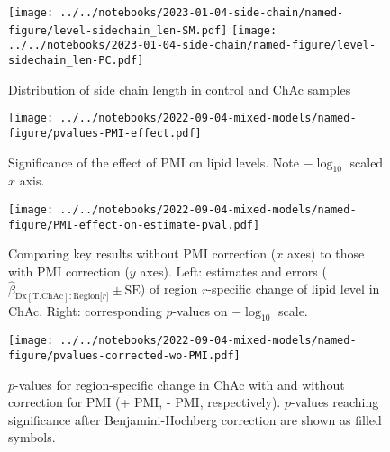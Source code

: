 \documentclass[letterpaper]{article}
\begin{document}
\begin{figure}[p]
	\texttt{[image: ../../notebooks/2023-01-04-side-chain/named-figure/level-sidechain\_len-SM.pdf]}
	\texttt{[image: ../../notebooks/2023-01-04-side-chain/named-figure/level-sidechain\_len-PC.pdf]}
\caption{
	Distribution of side chain length in control and ChAc samples
}
\label{fig:sidechain-SM}
\end{figure}

\begin{figure}[p]
\begin{center}
	\texttt{[image: ../../notebooks/2022-09-04-mixed-models/named-figure/pvalues-PMI-effect.pdf]}
\end{center}
	\caption[Significance of the effect of PMI on lipid levels]{
		Significance of the effect of PMI on lipid levels.  Note $-\log_{10}$ scaled $x$
		axis.
}
\label{fig:PMI-pvals}
\end{figure}

\begin{figure}[p]
\begin{center}
	\texttt{[image: ../../notebooks/2022-09-04-mixed-models/named-figure/PMI-effect-on-estimate-pval.pdf]}
\end{center}
	\caption[Comparing key results without PMI correction to those with PMI correction]{
		Comparing key results without PMI correction ($x$ axes) to those with PMI
		correction ($y$ axes).  Left: estimates and errors
		($\hat{\beta}_{\mathrm{Dx[T.ChAc]}:\mathrm{Region[}r\mathrm{]}} \pm
		\mathrm{SE}$) of region $r$-specific change of lipid level in ChAc.
		Right: corresponding $p$-values on $-\log_{10}$ scale.
}
\label{fig:PMI-effect-on-estimates}
\end{figure}

\begin{figure}[p]
\begin{center}
	\texttt{[image: ../../notebooks/2022-09-04-mixed-models/named-figure/pvalues-corrected-wo-PMI.pdf]}
\end{center}
	\caption[$p$-values for region-specific change in ChAc with and without correction for PMI]{
		$p$-values for region-specific change in ChAc with and without correction
		for PMI (+ PMI, - PMI, respectively).  $p$-values reaching significance
		after Benjamini-Hochberg correction are shown as filled symbols.
}
\label{fig:pvalues-corrected-wo-PMI}
\end{figure}
\end{document}
